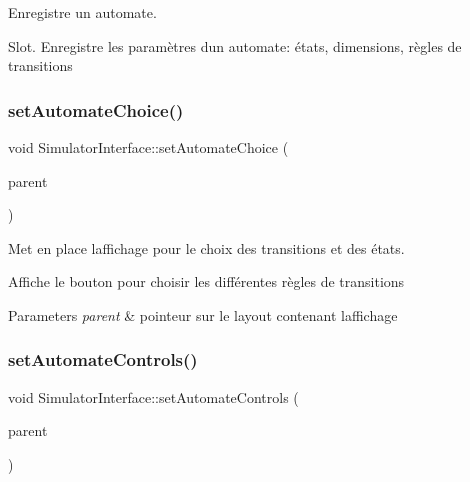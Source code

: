 Enregistre un automate. 

Slot. Enregistre les paramètres d\textquotesingle{}un automate\+: états, dimensions, règles de transitions \mbox{\label{class_simulator_interface_af9126d9fd35496a369f476974db559c5}} 
\subsubsection{\texorpdfstring{set\+Automate\+Choice()}{setAutomateChoice()}}
{\footnotesize\ttfamily void Simulator\+Interface\+::set\+Automate\+Choice (\begin{DoxyParamCaption}\item[{Q\+Box\+Layout $\ast$}]{parent }\end{DoxyParamCaption})\hspace{0.3cm}{\ttfamily [protected]}}



Met en place l\textquotesingle{}affichage pour le choix des transitions et des états. 

Affiche le bouton pour choisir les différentes règles de transitions 
\begin{DoxyParams}{Parameters}
{\em parent} & pointeur sur le layout contenant l\textquotesingle{}affichage \\
\hline
\end{DoxyParams}
\mbox{\label{class_simulator_interface_a4e0f810b745376a43fcdb7f97b870592}} 
\subsubsection{\texorpdfstring{set\+Automate\+Controls()}{setAutomateControls()}}
{\footnotesize\ttfamily void Simulator\+Interface\+::set\+Automate\+Controls (\begin{DoxyParamCaption}\item[{Q\+Box\+Layout $\ast$}]{parent }\end{DoxyParamCaption})\hspace{0.3cm}{\ttfamily [protected]}}



